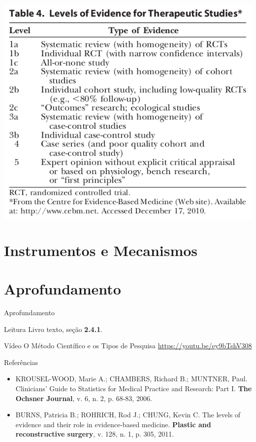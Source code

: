 \documentclass{beamer}
\begin{document}
\begin{frame}
  \begin{center}
    \includegraphics[width=.8\textwidth]{Metodos/ebm-t4}
  \end{center}
\end{frame}

\section{Instrumentos e Mecanismos}

\section{Aprofundamento}

\begin{frame}{Aprofundamento}
  \begin{block}{Leitura}
    Livro texto, seção {\bf 2.4.1}.
  \end{block}
  \begin{block}{Vídeo}
    O Método Científico e os Tipos de Pesquisa \href{https://youtu.be/ey9bTshV308}{https://youtu.be/ey9bTshV308}
  \end{block}

\end{frame}

\begin{frame}{Referências}
  \begin{itemize}
    \tiny
  \item KROUSEL-WOOD, Marie A.; CHAMBERS, Richard B.; MUNTNER, Paul. Clinicians' Guide to Statistics for Medical Practice and Research: Part I. {\bf The Ochsner Journal}, v. 6, n. 2, p. 68-83, 2006.
  \item BURNS, Patricia B.; ROHRICH, Rod J.; CHUNG, Kevin C. The levels of evidence and their role in evidence-based medicine. {\bf Plastic and reconstructive surgery}, v. 128, n. 1, p. 305, 2011.
  \end{itemize}
\end{frame}
\end{document}
